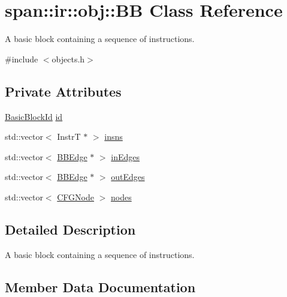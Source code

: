 \hypertarget{classspan_1_1ir_1_1obj_1_1BB}{}\section{span\+:\+:ir\+:\+:obj\+:\+:BB Class Reference}
\label{classspan_1_1ir_1_1obj_1_1BB}


A basic block containing a sequence of instructions.  




{\ttfamily \#include $<$objects.\+h$>$}

\subsection*{Private Attributes}
\begin{DoxyCompactItemize}
\item 
\hyperlink{namespacespan_ab988dafbd25ab39838239b91d6a86214}{Basic\+Block\+Id} \hyperlink{classspan_1_1ir_1_1obj_1_1BB_ab0b77a9e575276adaed35fe9ea628e76}{id}
\item 
std\+::vector$<$ InstrT $\ast$ $>$ \hyperlink{classspan_1_1ir_1_1obj_1_1BB_a34eba87f2fb7244ae64b2467c5e7351b}{insns}
\item 
std\+::vector$<$ \hyperlink{classspan_1_1ir_1_1obj_1_1BBEdge}{B\+B\+Edge} $\ast$ $>$ \hyperlink{classspan_1_1ir_1_1obj_1_1BB_a68884bf0898798e8e03477567f231fbb}{in\+Edges}
\item 
std\+::vector$<$ \hyperlink{classspan_1_1ir_1_1obj_1_1BBEdge}{B\+B\+Edge} $\ast$ $>$ \hyperlink{classspan_1_1ir_1_1obj_1_1BB_afc465f9afb8573e400f52fa8641fba85}{out\+Edges}
\item 
std\+::vector$<$ \hyperlink{classspan_1_1ir_1_1obj_1_1CFGNode}{C\+F\+G\+Node} $>$ \hyperlink{classspan_1_1ir_1_1obj_1_1BB_a67209b5148f3bd5cd74657e2d3129e47}{nodes}
\end{DoxyCompactItemize}


\subsection{Detailed Description}
A basic block containing a sequence of instructions. 

\subsection{Member Data Documentation}
\mbox{\label{classspan_1_1ir_1_1obj_1_1BB_ab0b77a9e575276adaed35fe9ea628e76}} 
